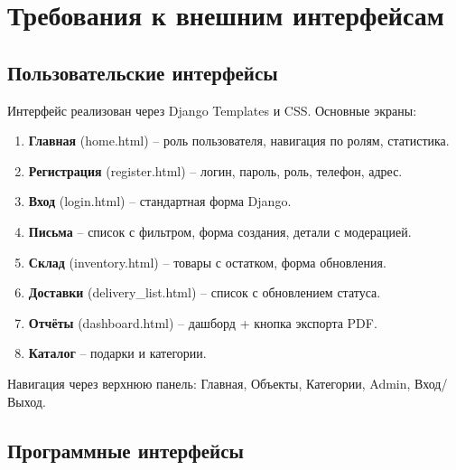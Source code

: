 \documentclass[14pt,a4paper]{extarticle}
\begin{document}
\newpage

\section{Требования к внешним интерфейсам}

\subsection{Пользовательские интерфейсы}

Интерфейс реализован через Django Templates и CSS. Основные экраны:

\begin{enumerate}
    \item \textbf{Главная} (home.html) -- роль пользователя, навигация по ролям, статистика.
    \item \textbf{Регистрация} (register.html) -- логин, пароль, роль, телефон, адрес.
    \item \textbf{Вход} (login.html) -- стандартная форма Django.
    \item \textbf{Письма} -- список с фильтром, форма создания, детали с модерацией.
    \item \textbf{Склад} (inventory.html) -- товары с остатком, форма обновления.
    \item \textbf{Доставки} (delivery\_list.html) -- список с обновлением статуса.
    \item \textbf{Отчёты} (dashboard.html) -- дашборд + кнопка экспорта PDF.
    \item \textbf{Каталог} -- подарки и категории.
\end{enumerate}

Навигация через верхнюю панель: Главная, Объекты, Категории, Admin, Вход/Выход.

\subsection{Программные интерфейсы}
\end{document}
